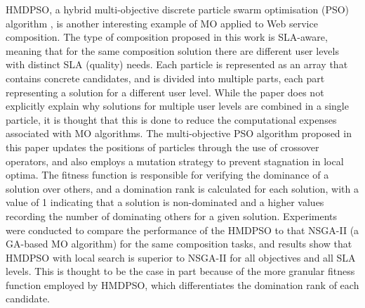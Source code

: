 HMDPSO, a hybrid multi-objective discrete particle swarm optimisation (PSO) algorithm \cite{yin2014hybrid}, is another interesting example of MO applied to Web service composition. The type of composition proposed in this work is SLA-aware, meaning that for the same composition solution there are different user levels with distinct SLA (quality) needs. Each particle is represented as an array that contains concrete candidates, and is divided into multiple parts, each part representing a solution for a different user level. While the paper does not explicitly explain why solutions for multiple user levels are combined in a single particle, it is thought that this is done to reduce the computational
expenses associated with MO algorithms. The multi-objective PSO algorithm proposed in this paper updates the positions of particles through the use of crossover operators, and also
employs a mutation strategy to prevent stagnation in local optima. The fitness function is responsible for verifying the dominance of a solution over others, and a domination rank is
calculated for each solution, with a value of 1 indicating that a solution is non-dominated and a higher values recording the number of dominating others for a given solution. Experiments were conducted to compare the performance of the HMDPSO to that NSGA-II (a GA-based MO algorithm) for the same composition tasks, and results show that HMDPSO with local search is superior to NSGA-II for all objectives and all SLA levels. This is thought to be the case in part because of the more granular fitness function employed by HMDPSO, which differentiates the domination rank of each candidate.

